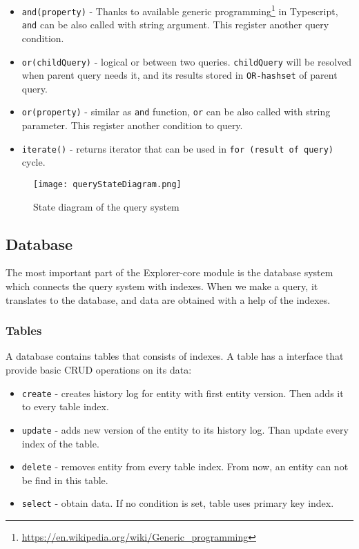 \begin{itemize}
    \item \texttt{and(property)} - Thanks to available generic programming\footnote{\url{https://en.wikipedia.org/wiki/Generic_programming}} in Typescript, \texttt{and} can be also called with string argument. This register another query condition.
    \item \texttt{or(childQuery)} - logical or between two queries. \texttt{childQuery} will be resolved when parent query needs it, and its results stored in \texttt{OR-hashset} of parent query. 
    \item \texttt{or(property)} - similar as \texttt{and} function, \texttt{or} can be also called with string parameter. This register another condition to query.
    \item \texttt{iterate()} - returns iterator that can be used in \texttt{for (result of query)} cycle.
\end{itemize}


\begin{figure}[h]
    \centering
    \texttt{[image: queryStateDiagram.png]}
    \caption{State diagram of the query system}
    \label{queryStateDiagram}
\end{figure}


\subsection{Database}
The most important part of the Explorer-core module is the database system which connects the query system with indexes. When we make a query, it translates to the database, and data are obtained with a help of the indexes.

\subsubsection{Tables}
A database contains tables that consists of indexes. A table has a interface that provide basic CRUD operations on its data:
\begin{itemize}
    \item \texttt{create} - creates history log for entity with first entity version. Then adds it to every table index.
    \item \texttt{update} - adds new version of the entity to its history log. Than update every index of the table.
    \item \texttt{delete} - removes entity from every table index. From now, an entity can not be find in this table.
    \item \texttt{select} - obtain data. If no condition is set, table uses primary key index.
\end{itemize}

